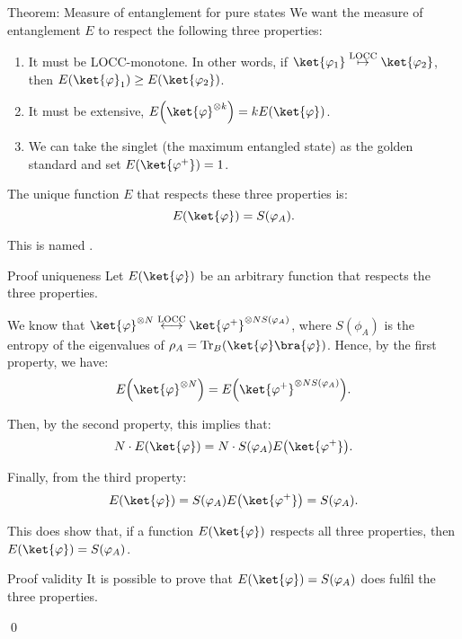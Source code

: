 \documentclass[a4paper]{article}
\begin{document}
\begin{parag}{Theorem: Measure of entanglement for pure states}
    We want the measure of entanglement $E$ to respect the following three properties:
    \begin{enumerate}
        \item It must be LOCC-monotone. In other words, if $\ket{\phi_1} \over{\mapsto}{LOCC} \ket{\phi_2}$, then $E\left(\ket{\phi}_1\right) \geq E\left(\ket{\phi_2}\right)$.
        \item It must be extensive, $E\left(\ket{\phi}^{\otimes k}\right) = k E\left(\ket{\phi}\right)$.
        \item We can take the singlet (the maximum entangled state) as the golden standard and set $E\left(\ket{\phi^+}\right) = 1$.
    \end{enumerate}

    The unique function $E$ that respects these three properties is:
    \[E\left(\ket{\phi}\right) = S\left(\phi_A\right).\]

    This is named .

    \begin{subparag}{Proof uniqueness}
        Let $E\left(\ket{\phi}\right)$ be an arbitrary function that respects the three properties. 

        We know that $\ket{\phi}^{\otimes N} \over{\longleftrightarrow}{LOCC} \ket{\phi^+}^{\otimes NS\left(\phi_A\right)}$, where $S\left(\phi_A\right)$ is the entropy of the eigenvalues of $\rho_A = \Tr_B\left(\ket{\phi}\bra{\phi}\right)$. Hence, by the first property, we have:
        \[E\left(\ket{\phi}^{\otimes N}\right) = E\left(\ket{\phi^+}^{\otimes N S\left(\phi_A\right)}\right).\]

        Then, by the second property, this implies that: 
        \[N\cdot  E\left(\ket{\phi}\right) = N\cdot  S\left(\phi_A\right) E\left(\ket{\phi^+}\right).\]

        Finally, from the third property: 
        \[E\left(\ket{\phi}\right) = S\left(\phi_A\right) E\left(\ket{\phi^+}\right) = S\left(\phi_A\right).\]

        This does show that, if a function $E\left(\ket{\phi}\right)$ respects all three properties, then $E\left(\ket{\phi}\right) = S\left(\phi_A\right)$.
    \end{subparag}

    \begin{subparag}{Proof validity}
        It is possible to prove that $E\left(\ket{\phi}\right) = S\left(\phi_A\right)$ does fulfil the three properties.
        
        \qed
    \end{subparag}
\end{parag}
\end{document}
